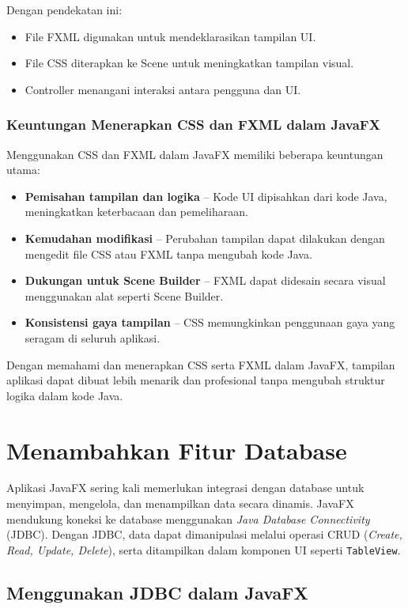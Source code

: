 Dengan pendekatan ini:
\begin{itemize}
	\item File FXML digunakan untuk mendeklarasikan tampilan UI.
	\item File CSS diterapkan ke Scene untuk meningkatkan tampilan visual.
	\item Controller menangani interaksi antara pengguna dan UI.
\end{itemize}

\subsubsection{Keuntungan Menerapkan CSS dan FXML dalam JavaFX}

Menggunakan CSS dan FXML dalam JavaFX memiliki beberapa keuntungan utama:
\begin{itemize}
	\item \textbf{Pemisahan tampilan dan logika} – Kode UI dipisahkan dari kode Java, meningkatkan keterbacaan dan pemeliharaan.
	\item \textbf{Kemudahan modifikasi} – Perubahan tampilan dapat dilakukan dengan mengedit file CSS atau FXML tanpa mengubah kode Java.
	\item \textbf{Dukungan untuk Scene Builder} – FXML dapat didesain secara visual menggunakan alat seperti Scene Builder.
	\item \textbf{Konsistensi gaya tampilan} – CSS memungkinkan penggunaan gaya yang seragam di seluruh aplikasi.
\end{itemize}

Dengan memahami dan menerapkan CSS serta FXML dalam JavaFX, tampilan aplikasi dapat dibuat lebih menarik dan profesional tanpa mengubah struktur logika dalam kode Java.


\section{Menambahkan Fitur Database}

Aplikasi JavaFX sering kali memerlukan integrasi dengan database untuk menyimpan, mengelola, dan menampilkan data secara dinamis. JavaFX mendukung koneksi ke database menggunakan \textit{Java Database Connectivity} (JDBC). Dengan JDBC, data dapat dimanipulasi melalui operasi CRUD (\textit{Create, Read, Update, Delete}), serta ditampilkan dalam komponen UI seperti \texttt{TableView}.

\subsection{Menggunakan JDBC dalam JavaFX}

